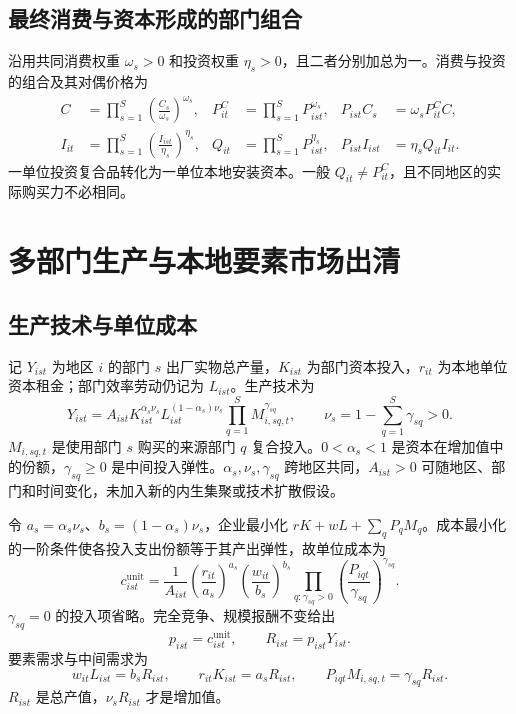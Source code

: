 \documentclass[UTF8,a4paper,zihao=-4,fontset=windows]{ctexart}
\numberwithin{equation}{section}
\newcommand{\pc}{P^{C}}
\newcommand{\invp}{Q}
\begin{document}
\subsection{最终消费与资本形成的部门组合}
沿用共同消费权重 $\omega_s>0$ 和投资权重 $\eta_s>0$，且二者分别加总为一。消费与投资的组合及其对偶价格为
\begin{align}
 C&=\prod_{s=1}^S\left(\frac{C_s}{\omega_s}\right)^{\omega_s},&
 \pc_{it}&=\prod_{s=1}^SP_{ist}^{\omega_s},&
 P_{ist}C_s&=\omega_s\pc_{it}C,
 \label{eq:lg-consumption-price}\\
 I_{it}&=\prod_{s=1}^S\left(\frac{I_{ist}}{\eta_s}\right)^{\eta_s},&
 \invp_{it}&=\prod_{s=1}^SP_{ist}^{\eta_s},&
 P_{ist}I_{ist}&=\eta_s\invp_{it}I_{it}.
 \label{eq:lg-investment-price}
\end{align}
一单位投资复合品转化为一单位本地安装资本。一般 $\invp_{it}\neq\pc_{it}$，且不同地区的实际购买力不必相同。

\section{多部门生产与本地要素市场出清}
\label{sec:lg-production}

\subsection{生产技术与单位成本}
记 $Y_{ist}$ 为地区 $i$ 的部门 $s$ 出厂实物总产量，$K_{ist}$ 为部门资本投入，$r_{it}$ 为本地单位资本租金；部门效率劳动仍记为 $L_{ist}$。生产技术为
\begin{equation}
 Y_{ist}=A_{ist}K_{ist}^{\alpha_s\nu_s}L_{ist}^{(1-\alpha_s)\nu_s}
 \prod_{q=1}^SM_{i,sq,t}^{\gamma_{sq}},\qquad
 \nu_s=1-\sum_{q=1}^S\gamma_{sq}>0.
 \label{eq:lg-production}
\end{equation}
$M_{i,sq,t}$ 是使用部门 $s$ 购买的来源部门 $q$ 复合投入。$0<\alpha_s<1$ 是资本在增加值中的份额，$\gamma_{sq}\geq0$ 是中间投入弹性。$\alpha_s,\nu_s,\gamma_{sq}$ 跨地区共同，$A_{ist}>0$ 可随地区、部门和时间变化，未加入新的内生集聚或技术扩散假设。

令 $a_s=\alpha_s\nu_s$、$b_s=(1-\alpha_s)\nu_s$，企业最小化 $rK+wL+\sum_qP_qM_q$。成本最小化的一阶条件使各投入支出份额等于其产出弹性，故单位成本为
\begin{equation}
 c^{\mathrm{unit}}_{ist}=\frac{1}{A_{ist}}
 \left(\frac{r_{it}}{a_s}\right)^{a_s}
 \left(\frac{w_{it}}{b_s}\right)^{b_s}
 \prod_{q:\gamma_{sq}>0}\left(\frac{P_{iqt}}{\gamma_{sq}}\right)^{\gamma_{sq}}.
 \label{eq:lg-unit-cost}
\end{equation}
$\gamma_{sq}=0$ 的投入项省略。完全竞争、规模报酬不变给出
\begin{equation}
 p_{ist}=c^{\mathrm{unit}}_{ist},\qquad R_{ist}=p_{ist}Y_{ist}.
 \label{eq:lg-zero-profit}
\end{equation}
要素需求与中间需求为
\begin{equation}
 w_{it}L_{ist}=b_sR_{ist},\qquad
 r_{it}K_{ist}=a_sR_{ist},\qquad
 P_{iqt}M_{i,sq,t}=\gamma_{sq}R_{ist}.
 \label{eq:lg-factor-demand}
\end{equation}
$R_{ist}$ 是总产值，$\nu_sR_{ist}$ 才是增加值。
\end{document}
